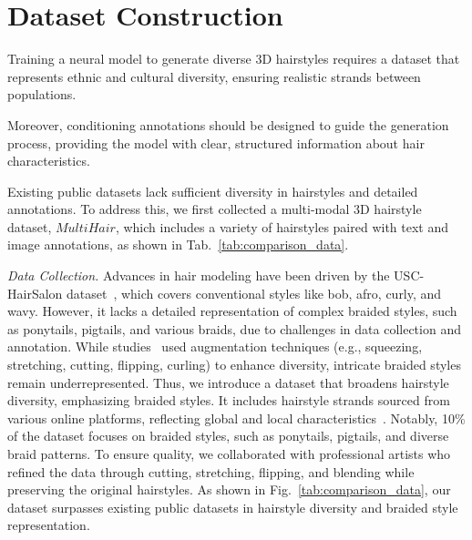 

\section{Dataset Construction}
\label{sec:data}
Training a neural model to generate diverse 3D hairstyles requires a dataset that represents ethnic and cultural diversity, ensuring realistic strands between populations.

Moreover, conditioning annotations should be designed to guide the generation process, providing the model with clear, structured information about hair characteristics.

Existing public datasets lack sufficient diversity in hairstyles and detailed annotations. To address this, we first collected a multi-modal 3D hairstyle dataset, $MultiHair$, which includes a variety of hairstyles paired with text and image annotations, as shown in Tab.~\ref{tab:comparison_data}.




\vspace{8pt}
\noindent \textit{Data Collection.}
Advances in hair modeling have been driven by the USC-HairSalon dataset~\cite{hu2015uschairsalon}, which covers conventional styles like bob, afro, curly, and wavy. However, it lacks a detailed representation of complex braided styles, such as ponytails, pigtails, and various braids, due to challenges in data collection and annotation. While studies~\cite{HAAR:CVPR:2024, he2024perm, Hair20k} used augmentation techniques (e.g., squeezing, stretching, cutting, flipping, curling) to enhance diversity, intricate braided styles remain underrepresented.
%
Thus, we introduce a dataset that broadens hairstyle diversity, emphasizing braided styles. It includes hairstyle strands sourced from various online platforms, reflecting global and local characteristics~\cite{meishvili2024hairmony}. Notably, 10\% of the dataset focuses on braided styles, such as ponytails, pigtails, and diverse braid patterns. To ensure quality, we collaborated with professional artists who refined the data through cutting, stretching, flipping, and blending while preserving the original hairstyles. As shown in Fig.~\ref{tab:comparison_data}, our dataset surpasses existing public datasets in hairstyle diversity and braided style representation.


